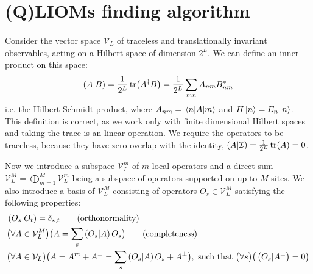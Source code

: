\section{(Q)LIOMs finding algorithm \label{sec:algorithm}}
  \paragraph{}Consider the vector space \(\mathcal{V}_L\) of traceless and translationally invariant
  observables, acting on a Hilbert space of dimension \(2^L\). We can define an inner product on this space:
  \begin{equation}
      \left(A|B\right) = \frac{1}{2^L}\tr(A^{\dagger}B) = \frac{1}{2^L} \sum_{mn} A_{nm}B_{nm}^{\ast}
  \end{equation}
  i.e. the Hilbert-Schmidt product, where \(A_{nm} = \matrixel{n}{A}{m}\) and \(H\ket{n} = E_n \ket{n}\). 
  This definition is correct, as we work only with finite dimensional Hilbert spaces and taking the trace is an
  linear operation. We require the operators to be traceless, because they have zero overlap with the identity, \(\left(A|\mathcal{I}\right)=\frac{1}{2^L}\tr(A) = 0\).
  
  Now we introduce a subspace \(\mathcal{V}_L^m\) of \(m\)-local operators and a direct sum 
  \(\mathcal{V}_L^M = \bigoplus_{m = 1}^M \mathcal{V}_L^m\) being a subspace of operators supported on up to \(M\) sites.
  We also introduce a basis of \(\mathcal{V}_L^M\) consisting of operators \(O_s\in \mathcal{V}_L^M\)
  satisfying the following properties:
  \begin{align*}
    & \hs{O_s}{O_{t}} = \delta_{s,t} \tag{\text{orthonormality}}\\
    & \big(\forall A \in \mathcal{V}_L^M\big) \big(A = \sum_s \hs{O_s}{A} O_s\big) \tag{\text{completeness}}\\
    & \big(\forall A \in \mathcal{V}_L \big) \big( A = A^m + A^{\perp} = \sum_s \hs{O_s}{A} O_s + A^{\perp}\big) ,
     \text{ such that } \big(\forall s\big) \big( \hs{O_s}{A^{\perp}} = 0\big) 
  \end{align*}
  

  
